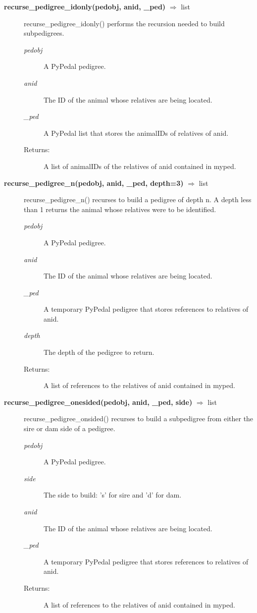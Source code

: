 \begin{description}
\item[\textbf{recurse\_pedigree\_idonly(pedobj, anid, \_ped)} $\Rightarrow$ list] 
recurse\_pedigree\_idonly() performs the recursion needed to build subpedigrees.
\begin{description}
\item[\emph{pedobj}] A PyPedal pedigree.
\item[\emph{anid}] The ID of the animal whose relatives are being located.
\item[\emph{\_ped}] A PyPedal list that stores the animalIDs of relatives of anid.
\item[Returns:] A list of animalIDs of the relatives of anid contained in myped.
\end{description}

\item[\textbf{recurse\_pedigree\_n(pedobj, anid, \_ped, depth=3)} $\Rightarrow$ list] 
recurse\_pedigree\_n() recurses to build a pedigree of depth n. A depth less than 1 returns the animal whose relatives were to be identified.
\begin{description}
\item[\emph{pedobj}] A PyPedal pedigree.
\item[\emph{anid}] The ID of the animal whose relatives are being located.
\item[\emph{\_ped}] A temporary PyPedal pedigree that stores references to relatives of anid.
\item[\emph{depth}] The depth of the pedigree to return.
\item[Returns:] A list of references to the relatives of anid contained in myped.
\end{description}

\item[\textbf{recurse\_pedigree\_onesided(pedobj, anid, \_ped, side)} $\Rightarrow$ list] 
recurse\_pedigree\_onsided() recurses to build a subpedigree from either the sire or dam side of a pedigree.
\begin{description}
\item[\emph{pedobj}] A PyPedal pedigree.
\item[\emph{side}] The side to build: 's' for sire and 'd' for dam.
\item[\emph{anid}] The ID of the animal whose relatives are being located.
\item[\emph{\_ped}] A temporary PyPedal pedigree that stores references to relatives of anid.
\item[Returns:] A list of references to the relatives of anid contained in myped.
\end{description}

\end{description}